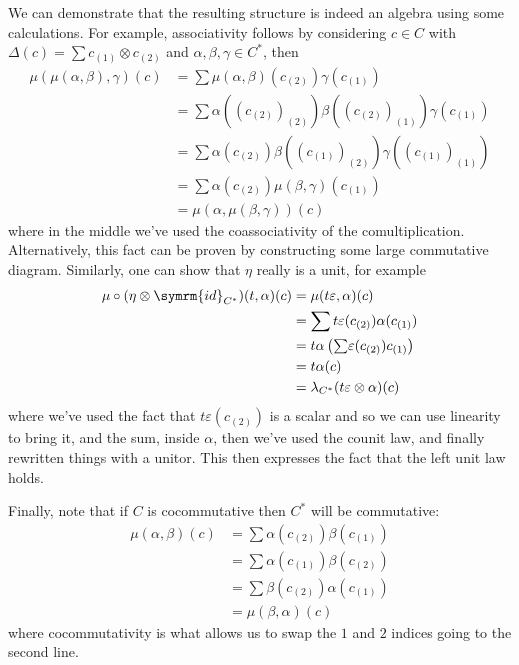 \documentclass[fleqn]{NotesClass}
\newcommand{\id}{\symrm{id}}
\newcommand{\tsum}{{\textstyle \sum}}
\begin{document}
    We can demonstrate that the resulting structure is indeed an algebra using some calculations.
    For example, associativity follows by considering \(c \in C\) with \(\Delta(c) = \sum c_{(1)} \otimes c_{(2)}\) and \(\alpha, \beta, \gamma \in C^*\), then
    \begin{align}
        \mu(\mu(\alpha, \beta), \gamma)(c) &= \sum \mu(\alpha, \beta)(c_{(2)}) \gamma(c_{(1)})\\
        &= \sum \alpha((c_{(2)})_{(2)}) \beta((c_{(2)})_{(1)}) \gamma(c_{(1)})\\
        &= \sum \alpha(c_{(2)}) \beta((c_{(1)})_{(2)}) \gamma((c_{(1)})_{(1)})\\
        &= \sum \alpha(c_{(2)}) \mu(\beta, \gamma)(c_{(1)})\\
        &= \mu(\alpha, \mu(\beta, \gamma))(c)
    \end{align}
    where in the middle we've used the coassociativity of the comultiplication.
    Alternatively, this fact can be proven by constructing some large commutative diagram.
    Similarly, one can show that \(\eta\) really is a unit, for example
    \begin{align}
        \mu \circ (\eta \otimes \id_{C^*})(t, \alpha)(c) &= \mu(t\varepsilon, \alpha)(c)\\
        &= \sum t\varepsilon(c_{(2)}) \alpha(c_{(1)})\\
        &= t \alpha\left( \tsum \varepsilon(c_{(2)}) c_{(1)} \right)\\
        &= t \alpha(c)\\
        &= \lambda_{C^*}(t\varepsilon \otimes \alpha)(c)
    \end{align}
    where we've used the fact that \(t \varepsilon(c_{(2)})\) is a scalar and so we can use linearity to bring it, and the sum, inside \(\alpha\), then we've used the counit law, and finally rewritten things with a unitor.
    This then expresses the fact that the left unit law holds.
    
    Finally, note that if \(C\) is cocommutative then \(C^*\) will be commutative:
    \begin{align}
        \mu(\alpha, \beta)(c) &= \sum \alpha(c_{(2)}) \beta(c_{(1)})\\
        &= \sum \alpha(c_{(1)}) \beta(c_{(2)})\\
        &= \sum \beta(c_{(2)}) \alpha(c_{(1)})\\
        &= \mu(\beta, \alpha)(c)
    \end{align}
    where cocommutativity is what allows us to swap the \(1\) and \(2\) indices going to the second line.
    
\end{document}
